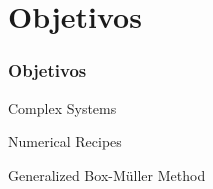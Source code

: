 
\section{Objetivos}

\begin{frame}
  \frametitle{Objetivos}

  Complex Systems \cite{Sayama:2015:ComplexSystems}
  \hfill \break

  Numerical Recipes \cite{Press:Numerical:Recipes}
  \hfill \break

  Generalized Box-Müller Method \cite{Tsallis:2007:GeneralizedBoxMuller}

\end{frame}
